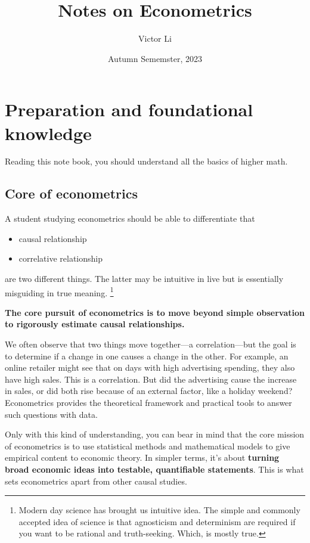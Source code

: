 \documentclass{article}
\title{Notes on Econometrics}
\author{Victor Li}
\date{Autumn Sememster, 2023}
\providecommand{\tightlist}{
  \setlength{\itemsep}{0pt}
  \setlength{\parskip}{0pt}}
\begin{document}
\maketitle

\newpage
\tableofcontents


\newpage
\section{Preparation and foundational knowledge}

Reading this note book, you should understand all the basics of higher math. 

\subsection{Core of econometrics} %
\label{sub:core_of_econometrics}

A student studying econometrics should be able to differentiate that
\begin{itemize}
\tightlist
  \item causal relationship
  \item correlative relationship
\end{itemize}
are two different things. The latter may be intuitive in live but is essentially misguiding in true meaning.
\footnote{Modern day science has brought us intuitive idea. The simple and commonly accepted idea of science is that agnosticism and determinism are required if you want to be rational and truth-seeking. Which, is mostly true.}

\textbf{The core pursuit of econometrics is to move beyond simple observation to rigorously estimate causal relationships.} 

We often observe that two things move together—a correlation—but the goal is to determine if a change in one causes a change in the other. For example, an online retailer might see that on days with high advertising spending, they also have high sales. This is a correlation. But did the advertising cause the increase in sales, or did both rise because of an external factor, like a holiday weekend? Econometrics provides the theoretical framework and practical tools to answer such questions with data.

Only with this kind of understanding, you can bear in mind that the core mission of econometrics is to use statistical methods and mathematical models to give empirical content to economic theory. In simpler terms, it's about \textbf{turning broad economic ideas into testable, quantifiable statements}. This is what sets econometrics apart from other causal studies.
\end{document}
